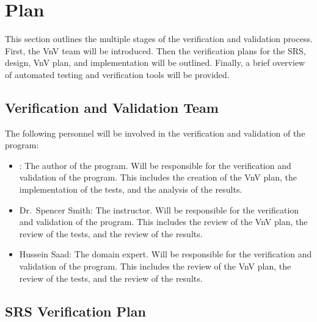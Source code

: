 \documentclass[12pt, titlepage]{article}
\begin{document}

\section{Plan}

This section outlines the multiple stages of the verification and validation
process. First, the VnV team will be introduced. Then the verification plans for
the SRS, design, VnV plan, and implementation will be outlined. Finally, a brief
overview of automated testing and verification tools will be provided. 


\subsection{Verification and Validation Team}


The following personnel will be involved in the verification and validation of
the \progname{} program:

\begin{itemize}
  \item \authname: The author of the program. Will be responsible for the
  verification and validation of the \progname{} program. This includes the creation
  of the VnV plan, the implementation of the tests, and the analysis of the
  results.
  \item Dr.~Spencer Smith: The instructor. Will be responsible for the
  verification and validation of the \progname{} program. This includes the review
  of the VnV plan, the review of the tests, and the review of the results.
  \item Hussein Saad: The domain expert. Will be responsible for the
  verification and validation of the \progname{} program. This includes the review
  of the VnV plan, the review of the tests, and the review of the results.
\end{itemize}

\subsection{SRS Verification Plan}
\end{document}
